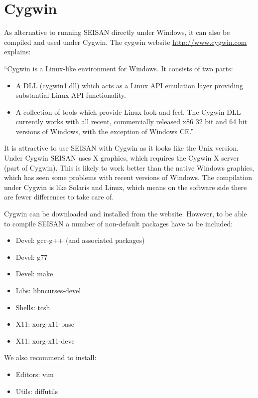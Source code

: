 \section{Cygwin} 

As alternative to running SEISAN directly under Windows, it can also be compiled and used under Cygwin. The cygwin website \url{http://www.cygwin.com} explains:  

``Cygwin is a Linux-like environment for Windows. It consists of two parts:  

\begin{itemize}
\item
A DLL (cygwin1.dll) which acts as a Linux API emulation layer providing substantial Linux API functionality. 
\item
A collection of tools which provide Linux look and feel.
The Cygwin DLL currently works with all recent, commercially released 
x86 32 bit and 64 bit versions of Windows, with the exception of Windows CE.''
\end{itemize}

It is attractive to use SEISAN with Cygwin as it looks like the Unix version. Under Cygwin SEISAN uses X graphics, which requires the Cygwin X server (part of Cygwin). This is likely to work better than the native Windows graphics, which has seen some problems with recent versions of Windows. The compilation under Cygwin is like Solaris and Linux, which means on the software side there are fewer differences to take care of. 

Cygwin can be downloaded and installed from the website. However, to be able to compile SEISAN a number of non-default packages have to be included: 
\begin{itemize}
\item 
Devel: gcc-g++ (and associated packages) 
\item 
Devel: g77 
\item 
Devel: make 
\item 
Libs: libncurses-devel 
\item 
Shells: tcsh 
\item 
X11: xorg-x11-base 
\item 
X11: xorg-x11-deve 
\end{itemize}


We also recommend to install: 
\begin{itemize}
\item 
Editors: vim 
\item 
Utils: diffutils 
\end{itemize}


